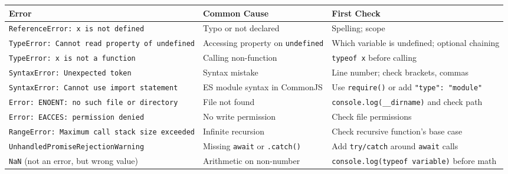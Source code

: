 \documentclass[
  justified,
  openright,
]{tufte-book}
\begin{document}
\begin{fullwidth}{\def\LTcaptype{none} %
\begin{longtable}[]{@{}
  >{\raggedright\arraybackslash}p{}
  >{\raggedright\arraybackslash}p{}
  >{\raggedright\arraybackslash}p{}@{}}
\toprule\noalign{}
\begin{minipage}[b]{\linewidth}\raggedright
Error
\end{minipage} & \begin{minipage}[b]{\linewidth}\raggedright
Common Cause
\end{minipage} & \begin{minipage}[b]{\linewidth}\raggedright
First Check
\end{minipage} \\
\midrule\noalign{}
\endhead
\bottomrule\noalign{}
\endlastfoot
\texttt{ReferenceError:\ x\ is\ not\ defined} & Typo or not declared &
Spelling; scope \\
\texttt{TypeError:\ Cannot\ read\ property\ of\ undefined} & Accessing
property on \texttt{undefined} & Which variable is undefined; optional
chaining \\
\texttt{TypeError:\ x\ is\ not\ a\ function} & Calling non-function &
\texttt{typeof\ x} before calling \\
\texttt{SyntaxError:\ Unexpected\ token} & Syntax mistake & Line number;
check brackets, commas \\
\texttt{SyntaxError:\ Cannot\ use\ import\ statement} & ES module syntax
in CommonJS & Use \texttt{require()} or add
\texttt{"type":\ "module"} \\
\texttt{Error:\ ENOENT:\ no\ such\ file\ or\ directory} & File not found
& \texttt{console.log(\_\_dirname)} and check path \\
\texttt{Error:\ EACCES:\ permission\ denied} & No write permission &
Check file permissions \\
\texttt{RangeError:\ Maximum\ call\ stack\ size\ exceeded} & Infinite
recursion & Check recursive function's base case \\
\texttt{UnhandledPromiseRejectionWarning} & Missing \texttt{await} or
\texttt{.catch()} & Add \texttt{try/catch} around \texttt{await}
calls \\
\texttt{NaN} (not an error, but wrong value) & Arithmetic on non-number
& \texttt{console.log(typeof\ variable)} before math \\
\end{longtable}
}
\end{fullwidth}
\end{document}
